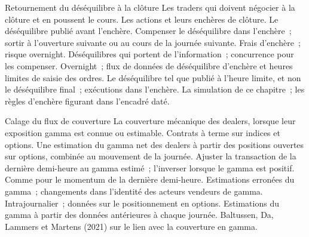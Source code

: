 \begin{strategyfile}{Retournement du déséquilibre à la clôture}\label{strat:s1:intraday-patterns:imbalance}
 Les traders qui doivent négocier à la clôture et en poussent le cours.
 Les actions et leurs enchères de clôture.
 Le déséquilibre publié avant l'enchère.
 Compenser le déséquilibre dans l'enchère~; sortir à l'ouverture suivante ou au cours de la journée suivante.
 Frais d'enchère~; risque overnight.
 Déséquilibres qui portent de l'information~; concurrence pour les compenser.
 Overnight~; flux de données de déséquilibre d'enchère et heures limites de saisie des ordres.
 Le déséquilibre tel que publié à l'heure limite, et non le déséquilibre final~; exécutions dans l'enchère.
 La simulation de ce chapitre~; les règles d'enchère figurant dans l'encadré daté.
\end{strategyfile}

\begin{strategyfile}{Calage du flux de couverture}\label{strat:s1:intraday-patterns:hedging}
 La couverture mécanique des dealers, lorsque leur exposition gamma est connue ou estimable.
 Contrats à terme sur indices et options.
 Une estimation du gamma net des dealers à partir des positions ouvertes sur options, combinée au mouvement de la journée.
 Ajuster la transaction de la dernière demi-heure au gamma estimé~; l'inverser lorsque le gamma est positif.
 Comme pour le momentum de la dernière demi-heure.
 Estimations erronées du gamma~; changements dans l'identité des acteurs vendeurs de gamma.
 Intrajournalier~; données sur le positionnement en options.
 Estimations du gamma à partir des données antérieures à chaque journée.
 Baltussen, Da, Lammers et Martens (2021) sur le lien avec la couverture en gamma.
\end{strategyfile}

